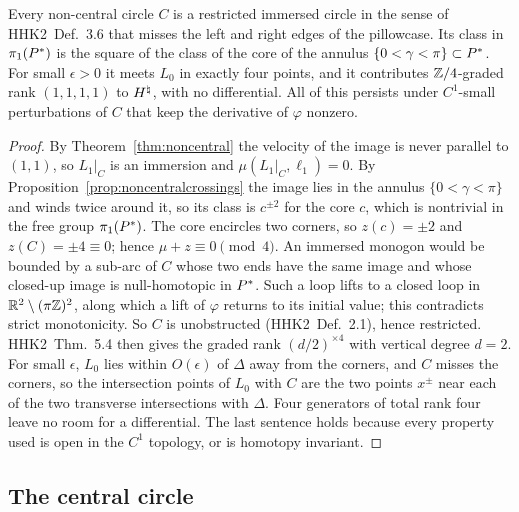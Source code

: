 \begin{corollary}\label{cor:noncentralrestricted}
Every non-central circle $C$ is a restricted immersed circle in the sense of HHK2~Def.~3.6 that misses the left
and right edges of the pillowcase. Its class in $\pi_1(P^{*})$ is the square of the class of the core of the annulus
$\{0<\gamma<\pi\}\subset P^{*}$. For small $\epsilon>0$ it meets $L_0$ in exactly four points, and it contributes
$\mathbb{Z}/4$-graded rank $(1,1,1,1)$ to $H^{\natural}$, with no differential. All of this persists under $C^1$-small
perturbations of $C$ that keep the derivative of $\varphi$ nonzero.
\end{corollary}

\begin{proof}
By Theorem~\ref{thm:noncentral} the velocity of the image is never parallel to $(1,1)$, so $L_1|_C$ is an immersion and
$\mu(L_1|_C,\ell_1)=0$. By Proposition~\ref{prop:noncentralcrossings} the image lies in the annulus
$\{0<\gamma<\pi\}$ and winds twice around it, so its class is $c^{\pm2}$ for the core $c$, which is nontrivial in the free
group $\pi_1(P^{*})$. The core encircles two corners, so $z(c)=\pm2$ and $z(C)=\pm4\equiv0$; hence $\mu+z\equiv0\pmod 4$. An immersed monogon would be bounded by a sub-arc
of $C$ whose two ends have the same image and whose closed-up image is null-homotopic in $P^{*}$. Such a loop lifts to a
closed loop in $\mathbb{R}^2\setminus(\pi\mathbb{Z})^2$, along which a lift of $\varphi$ returns to its initial value; this contradicts strict
monotonicity. So $C$ is unobstructed (HHK2~Def.~2.1), hence restricted. HHK2~Thm.~5.4 then gives the graded rank
$(d/2)^{\times4}$ with vertical degree $d=2$. For small $\epsilon$, $L_0$ lies within $O(\epsilon)$ of $\Delta$ away from the corners,
and $C$ misses the corners, so the intersection points of $L_0$ with $C$ are the two points $x^\pm$ near each of the two
transverse intersections with $\Delta$. Four generators of total rank four leave no room for a differential. The last
sentence holds because every property used is open in the $C^1$ topology, or is homotopy invariant.
\end{proof}

\subsection{The central circle}\label{subsec:central}

